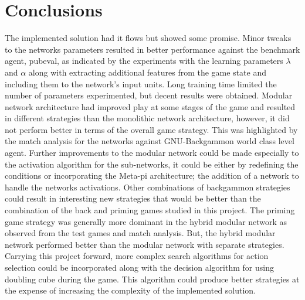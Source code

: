 \documentclass[12pt,a4paper]{article}
\begin{document}
\section{Conclusions}
The implemented solution had it flows but showed some promise. Minor tweaks to the networks parameters resulted in better performance against the benchmark agent, pubeval, as indicated by the experiments with the learning parameters $\lambda$ and $\alpha$ along with extracting additional features from the game state and including them to the network's input units. Long training time limited the number of parameters experimented, but decent results were obtained. Modular network architecture had improved play at some stages of the game and resulted in different strategies than the monolithic network architecture, however, it did not perform better in terms of the overall game strategy. This was highlighted by the match analysis for the networks against GNU-Backgammon world class level agent. Further improvements to the modular network could be made especially to the activation algorithm for the sub-networks, it could be either by redefining the conditions or incorporating the Meta-pi architecture; the addition of a network to handle the networks activations. Other combinations of backgammon strategies could result in interesting new strategies that would be better than the combination of the back and priming games studied in this project. The priming game strategy was generally more dominant in the hybrid modular network as observed from the test games and match analysis. But, the hybrid modular network performed better than the modular network with separate strategies. Carrying this project forward, more complex search algorithms for action selection could be incorporated along with the decision algorithm for using doubling cube during the game. This algorithm could produce better strategies at the expense of increasing the complexity of the implemented solution. 


\end{document}
